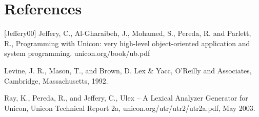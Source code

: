 \documentclass[letterpaper,12pt]{article}
\begin{document}
\section*{References}

[Jeffery00] Jeffery, C., Al-Gharaibeh, J., Mohamed, S.,
Pereda, R. and Parlett, R., 
Programming with Unicon: very high-level object-oriented application
and system programming.  unicon.org/book/ub.pdf

\noindent
[Levine92] Levine, J. R., Mason, T., and Brown, D.
Lex \& Yacc, O’Reilly and Associates, Cambridge, Massachusetts, 1992.

\noindent
[Ray03] Ray, K., Pereda, R., and Jeffery, C., Ulex – A
Lexical Analyzer Generator for Unicon, 
Unicon Technical Report 2a, unicon.org/utr/utr2/utr2a.pdf,
May 2003.
\end{document}
